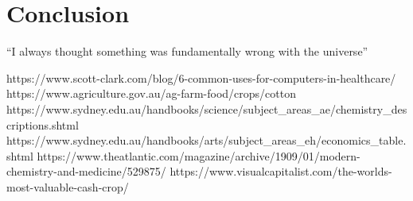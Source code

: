 \documentclass[12pt]{article}
\begin{document}
\newpage
\section{Conclusion}
``I always thought something was fundamentally wrong with the universe\cite{Burridge_2018a}''
{}

% 










https://www.scott-clark.com/blog/6-common-uses-for-computers-in-healthcare/
https://www.agriculture.gov.au/ag-farm-food/crops/cotton
https://www.sydney.edu.au/handbooks/science/subject_areas_ae/chemistry_descriptions.shtml
https://www.sydney.edu.au/handbooks/arts/subject_areas_eh/economics_table.shtml
https://www.theatlantic.com/magazine/archive/1909/01/modern-chemistry-and-medicine/529875/
https://www.visualcapitalist.com/the-worlds-most-valuable-cash-crop/
\end{document}

